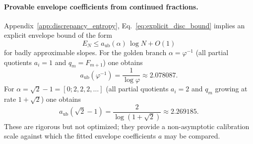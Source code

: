 \paragraph{Provable envelope coefficients from continued fractions.}
Appendix~\ref{app:discrepancy_entropy}, Eq.~\eqref{eq:explicit_disc_bound} implies an explicit envelope bound of the form
\[
  E_N \le a_{\mathrm{ub}}(\alpha)\,\log N + O(1)
\]
for badly approximable slopes. For the golden branch $\alpha=\varphi^{-1}$ (all partial quotients $a_i=1$ and $q_m=F_{m+1}$) one obtains
\[
  a_{\mathrm{ub}}(\varphi^{-1}) = \frac{1}{\log\varphi}\approx 2.078087.
\]
For $\alpha=\sqrt{2}-1=[0;2,2,2,\dots]$ (all partial quotients $a_i=2$ and $q_m$ growing at rate $1+\sqrt{2}$) one obtains
\[
  a_{\mathrm{ub}}(\sqrt{2}-1)=\frac{2}{\log(1+\sqrt{2})}\approx 2.269185.
\]
These are rigorous but not optimized; they provide a non-asymptotic calibration scale against which the fitted envelope coefficients $a$ may be compared.

